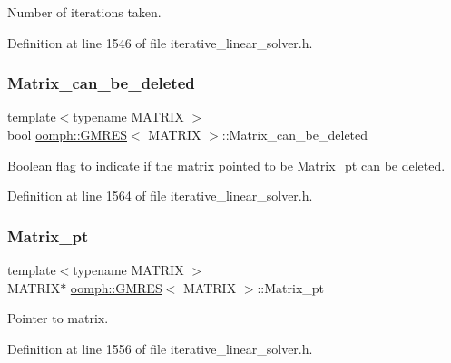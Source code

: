 Number of iterations taken. 



Definition at line 1546 of file iterative\+\_\+linear\+\_\+solver.\+h.

\mbox{\label{classoomph_1_1GMRES_a4d5464a324bf0a190a5a979f899c8542}} 
\subsubsection{\texorpdfstring{Matrix\+\_\+can\+\_\+be\+\_\+deleted}{Matrix\_can\_be\_deleted}}
{\footnotesize\ttfamily template$<$typename M\+A\+T\+R\+IX $>$ \\
bool \hyperlink{classoomph_1_1GMRES}{oomph\+::\+G\+M\+R\+ES}$<$ M\+A\+T\+R\+IX $>$\+::Matrix\+\_\+can\+\_\+be\+\_\+deleted\hspace{0.3cm}{\ttfamily [private]}}



Boolean flag to indicate if the matrix pointed to be Matrix\+\_\+pt can be deleted. 



Definition at line 1564 of file iterative\+\_\+linear\+\_\+solver.\+h.

\mbox{\label{classoomph_1_1GMRES_a2edf4333ceb415b8ba9126e1c5d51ce8}} 
\subsubsection{\texorpdfstring{Matrix\+\_\+pt}{Matrix\_pt}}
{\footnotesize\ttfamily template$<$typename M\+A\+T\+R\+IX $>$ \\
M\+A\+T\+R\+IX$\ast$ \hyperlink{classoomph_1_1GMRES}{oomph\+::\+G\+M\+R\+ES}$<$ M\+A\+T\+R\+IX $>$\+::Matrix\+\_\+pt\hspace{0.3cm}{\ttfamily [private]}}



Pointer to matrix. 



Definition at line 1556 of file iterative\+\_\+linear\+\_\+solver.\+h.


